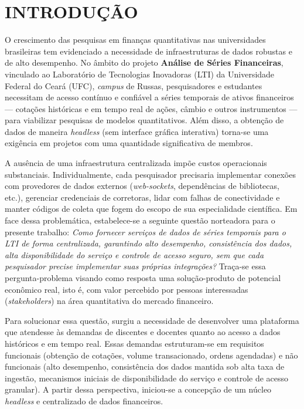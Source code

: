\chapter{INTRODUÇÃO}

O crescimento das pesquisas em finanças quantitativas nas universidades brasileiras tem evidenciado a necessidade de infraestruturas de dados robustas e de alto desempenho. No âmbito do projeto \textbf{Análise de Séries Financeiras}, vinculado ao Laboratório de Tecnologias Inovadoras (LTI) da Universidade Federal do Ceará (UFC), \textit{campus} de Russas, pesquisadores e estudantes necessitam de acesso contínuo e confiável a séries temporais de ativos financeiros — cotações históricas e em tempo real de ações, câmbio e outros instrumentos — para viabilizar pesquisas de modelos quantitativos. Além disso, a obtenção de dados de maneira \textit{headless} (sem interface gráfica interativa) torna-se uma exigência em projetos com uma quantidade significativa de membros.

A ausência de uma infraestrutura centralizada impõe custos operacionais substanciais. Individualmente, cada pesquisador precisaria implementar conexões com provedores de dados externos (\textit{web-sockets}, dependências de bibliotecas, etc.), gerenciar credenciais de corretoras, lidar com falhas de conectividade e manter códigos de coleta que fogem do escopo de sua especialidade científica. Em face dessa problemática, estabelece-se a seguinte questão norteadora para o presente trabalho: \textit{Como fornecer serviços de dados de séries temporais para o LTI de forma centralizada, garantindo alto desempenho, consistência dos dados, alta disponibilidade do serviço e controle de acesso seguro, sem que cada pesquisador precise implementar suas próprias integrações?} Traça-se essa pergunta-problema visando como resposta uma solução-produto de potencial econômico real, isto é, com valor percebido por pessoas interessadas (\textit{stakeholders}) na área quantitativa do mercado financeiro.

Para solucionar essa questão, surgiu a necessidade de desenvolver uma plataforma que atendesse às demandas de discentes e docentes quanto ao acesso a dados históricos e em tempo real. Essas demandas estruturam-se em requisitos funcionais (obtenção de cotações, volume transacionado, ordens agendadas) e não funcionais (alto desempenho, consistência dos dados mantida sob alta taxa de ingestão, mecanismos iniciais de disponibilidade do serviço e controle de acesso granular). A partir dessa perspectiva, iniciou-se a concepção de um núcleo \textit{headless} e centralizado de dados financeiros.

